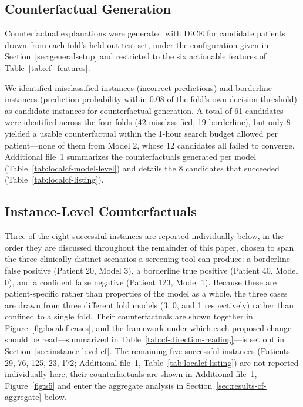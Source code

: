 \documentclass[pdflatex,sn-mathphys-num]{sn-jnl}%
\theoremstyle{thmstyleone}%
\theoremstyle{thmstyletwo}%
\theoremstyle{thmstylethree}%
\begin{document}
\subsection{Counterfactual Generation}
\label{sec:results-counterfactuals}
Counterfactual explanations were generated with DiCE for candidate patients drawn from each fold's held-out test set, under the configuration given in Section~\ref{sec:generalsetup} and restricted to the six actionable features of Table~\ref{tab:cf_features}.

We identified misclassified instances (incorrect predictions) and borderline instances (prediction probability within 0.08 of the fold's own decision threshold) as candidate instances for counterfactual generation. A total of 61 candidates were identified across the four folds (42 misclassified, 19 borderline), but only 8 yielded a usable counterfactual within the 1-hour search budget allowed per patient---none of them from Model 2, whose 12 candidates all failed to converge. Additional file~1 summarizes the counterfactuals generated per model (Table~\ref{tab:localcf-model-level}) and details the 8 candidates that succeeded (Table~\ref{tab:localcf-listing}).



\subsection{Instance-Level Counterfactuals}
\label{sec:results-cf-cases}
Three of the eight successful instances are reported individually below, in the order they are discussed throughout the remainder of this paper, chosen to span the three clinically distinct scenarios a screening tool can produce: a borderline false positive (Patient 20, Model 3), a borderline true positive (Patient 40, Model 0), and a confident false negative (Patient 123, Model 1). Because these are patient-specific rather than properties of the model as a whole, the three cases are drawn from three different fold models (3, 0, and 1 respectively) rather than confined to a single fold. Their counterfactuals are shown together in Figure~\ref{fig:localcf-cases}, and the framework under which each proposed change should be read---summarized in Table~\ref{tab:cf-direction-reading}---is set out in Section~\ref{sec:instance-level-cf}. The remaining five successful instances (Patients 29, 76, 125, 23, 172; Additional file~1, Table~\ref{tab:localcf-listing}) are not reported individually here; their counterfactuals are shown in Additional file~1, Figure~\ref{fig:s5}  and enter the aggregate analysis in Section~\ref{sec:results-cf-aggregate} below.
\end{document}
